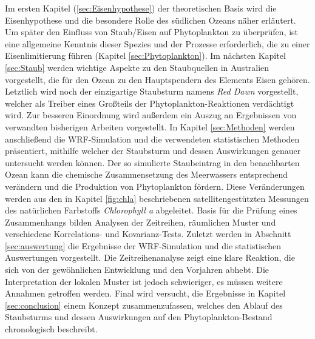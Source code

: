 \documentclass[12pt,a4paper,onecolumn]{scrartcl}
\begin{document}
Im ersten Kapitel (\ref{sec:Eisenhypothese}) der theoretischen Basis wird die Eisenhypothese und die besondere Rolle des südlichen Ozeans näher erläutert. Um später den Einfluss von Staub/Eisen auf Phytoplankton zu überprüfen, ist eine allgemeine Kenntnis dieser Spezies und der Prozesse erforderlich, die zu einer Eisenlimitierung führen (Kapitel \ref{sec:Phytoplankton}). Im nächsten Kapitel \ref{sec:Staub} werden wichtige Aspekte zu den Staubquellen in Australien vorgestellt, die für den Ozean zu den Hauptspendern des Elements Eisen gehören. Letztlich wird noch der einzigartige Staubsturm namens \textit{Red Dawn} vorgestellt, welcher als Treiber eines Großteils der Phytoplankton-Reaktionen verdächtigt wird. Zur besseren Einordnung wird außerdem ein Auszug an Ergebnissen von verwandten bisherigen Arbeiten vorgestellt. In Kapitel \ref{sec:Methoden} werden anschließend die WRF-Simulation und die verwendeten statistischen Methoden präsentiert, mithilfe welcher der Staubsturm und dessen Auswirkungen genauer untersucht werden können. Der so simulierte Staubeintrag in den benachbarten Ozean kann die chemische Zusammensetzung des Meerwassers entsprechend verändern und die Produktion von Phytoplankton fördern. Diese Veränderungen werden aus den in Kapitel \ref{fig:chla} beschriebenen satellitengestützten Messungen des natürlichen Farbstoffs \textit{Chlorophyll a} abgeleitet. Basis für die Prüfung eines Zusammenhangs bilden Analysen der Zeitreihen, räumlichen Muster und verschiedene Korrelations- und Kovarianz-Tests. Zuletzt werden in Abschnitt \ref{sec:auswertung} die Ergebnisse der WRF-Simulation und die statistischen Auswertungen vorgestellt. Die Zeitreihenanalyse zeigt eine klare Reaktion, die sich von der gewöhnlichen Entwicklung und den Vorjahren abhebt. Die Interpretation der lokalen Muster ist jedoch schwieriger, es müssen weitere Annahmen getroffen werden. Final wird versucht, die Ergebnisse in Kapitel \ref{sec:conclusion} einem Konzept zusammenzufassen, welches den Ablauf des Staubsturms und dessen Auswirkungen auf den Phytoplankton-Bestand chronologisch beschreibt.
\end{document}

